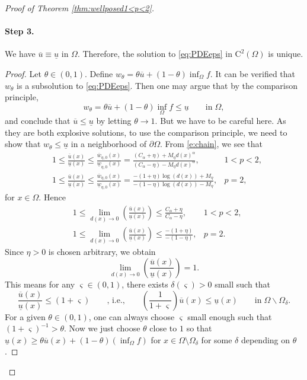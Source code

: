 \documentclass[12pt,reqno]{amsart}
\numberwithin{figure}{section}
\theoremstyle{plain}
\theoremstyle{remark}
\numberwithin{equation}{section}
\begin{document}
\begin{appendices}
\begin{proof} [Proof of Theorem \ref{thm:wellposed1<p<2}]
\paragraph{\textbf{Step 3.}} We have $\overline{u}\equiv \underline{u}$ in $\Omega$. Therefore, the solution to \eqref{eq:PDEeps} in $\mathrm{C}^2(\Omega)$ is unique.

\begin{proof} Let $\theta\in (0,1)$. Define $w_\theta = \theta \overline{u} + (1-\theta) \inf_{\Omega} f$. It can be verified that $w_\theta$ is a subsolution to \eqref{eq:PDEeps}. Then one may argue that by the comparison principle,
\begin{equation*}
    w_\theta = \theta \overline{u} + (1-\theta)\inf_{\Omega} f\leq \underline{u} \qquad\text{in}\;\Omega,
\end{equation*}
and conclude that $\overline{u} \leq \underline{u}$ by letting $\theta\to 1$. But we have to be careful here. As they are both explosive solutions, to use the comparison principle, we need to show that $w_\theta \leq \underline{u}$ in a neighborhood of $\partial\Omega$. From \eqref{e:chain}, we see that
\begin{align*}
    &1\leq \frac{\overline{u}(x)}{\underline{u}(x)} \leq \frac{\overline{w}_{\eta,0}(x)}{\underline{w}_{\eta,0}(x)} = \frac{(C_\alpha+\eta)+ M_\eta d(x)^\alpha}{(C_\alpha-\eta)- M_\eta d(x)^\alpha},& 1<p<2,\\
    &1 \leq \frac{\overline{u}(x)}{\underline{u}(x)} \leq \frac{\overline{w}_{\eta,0}(x)}{\underline{w}_{\eta,0}(x)} = \frac{-(1+\eta)\log(d(x)) + M_\eta}{-(1-\eta)\log(d(x))-M_\eta}, & p=2,
\end{align*}
for $x\in \Omega$. Hence
\begin{align*}
     &1\leq  \lim_{d(x)\to 0} \left(\frac{\overline{u}(x)}{\underline{u}(x)}\right) \leq \frac{C_\alpha+\eta}{C_\alpha-\eta}, & 1< p < 2,\\
     &1\leq  \lim_{d(x)\to 0} \left(\frac{\overline{u}(x)}{\underline{u}(x)}\right) \leq \frac{-(1+\eta)}{-(1-\eta)}, & p = 2.
\end{align*}
Since $\eta>0$ is chosen arbitrary, we obtain
\begin{equation*}
     \lim_{d(x)\to 0} \left(\frac{\overline{u}(x)}{\underline{u}(x)}\right) = 1.
\end{equation*}
 This means for any $\varsigma\in(0,1)$, there exists $\delta(\varsigma)>0$ small such that 
\begin{equation*}
\frac{\overline{u}(x)}{\underline{u}(x)}\leq (1+\varsigma)     \qquad \text{, i.e.,}\qquad \left(\frac{1}{1+\varsigma}\right)\overline{u}(x) \leq \underline{u}(x) \qquad\text{in}\; \Omega\backslash \Omega_\delta.
\end{equation*}
For a given $\theta\in (0,1)$, one can always choose $\varsigma$ small enough such that $(1+\varsigma)^{-1} > \theta$. Now we just choose $\theta$ close to $1$ so that $\underline{u}(x) \geq \theta \overline{u}(x) + (1-\theta)\left(\inf_\Omega f\right)$ for $x \in \Omega \setminus \Omega_\delta$ for some $\delta$ depending on $\theta$.
\end{proof}



\end{proof}
\end{appendices}
\end{document}
